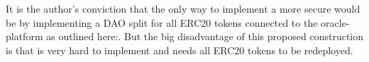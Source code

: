 \documentclass[a4paper]{article}
\begin{document}
It is the author's conviction that the only way to implement a more secure would be by implementing a DAO split for all ERC20 tokens connected to the oracle-platform as outlined here:\cite{oracleDAOsplit}. But the big disadvantage of this proposed construction is that is very hard to implement and needs all ERC20 tokens to be redeployed.



\end{document}
